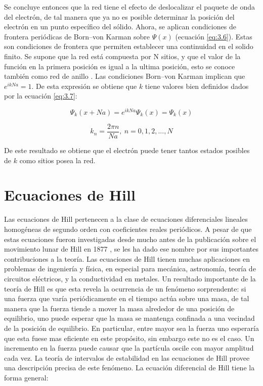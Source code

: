 Se concluye entonces que la red tiene el efecto de deslocalizar el paquete de onda del electrón, de tal manera que ya no es posible determinar la posición del electrón en un punto específico del sólido. 
Ahora, se aplican condiciones de frontera periódicas de Born–von Karman sobre $\Psi(x)$ (ecuación \ref{eq:3.6}). Estas son condiciones de frontera que permiten establecer una continuidad en el solido finito. Se supone que la red está compuesta por N sitios, y que el valor de la función en la primera posición es igual a la ultima posición, esto se conoce también como red de anillo \cite{solidos}. Las condiciones Born–von Karman implican que $e^{ikNa}=1$. De esta expresión se obtiene que $k$ tiene valores bien definidos dados por la ecuación \ref{eq:3.7}:

\begin{equation}\label{eq:3.6}
    \Psi_k(x+Na)=e^{ikNa}\Psi_k(x)=\Psi_k(x)
\end{equation}

\begin{equation}\label{eq:3.7}
k_n=\frac{2\pi n}{Na}, \ n={0,1,2,...,N}
\end{equation}

De este resultado se obtiene que el electrón puede tener tantos estados posibles de $k$ como sitios posea la red.


\section{Ecuaciones de Hill}\label{cap:4}

Las ecuaciones de Hill pertenecen a la clase de ecuaciones diferenciales lineales homogéneas de segundo orden con coeficientes reales periódicos. A pesar de que estas ecuaciones fueron investigadas desde mucho antes de la publicación sobre el movimiento lunar de Hill en 1877 \cite{moon}, se les ha dado ese nombre por sus importantes contribuciones a la teoría. Las ecuaciones de Hill tienen muchas aplicaciones en problemas de ingeniería y física, en especial para mecánica, astronomía, teoría de circuitos eléctricos, y la conductividad en metales. 
Un resultado importante de la teoría de Hill es que esta revela la ocurrencia de un fenómeno sorprendente: si una fuerza que varía periódicamente en el tiempo actúa sobre una masa, de tal manera que la fuerza tiende a mover la masa alrededor de una posición de equilibrio, uno puede esperar que la masa se mantenga confinada a una vecindad de la posición de equilibrio. En particular, entre mayor sea la fuerza uno esperaría que esta fuese mas eficiente en este propósito, sin embargo este no es el caso. Un incremento en la fuerza puede causar que la partícula oscile con mayor amplitud cada vez. La teoría de intervalos de estabilidad en las ecuaciones de Hill provee una descripción precisa de este fenómeno.
La ecuación diferencial de Hill tiene la forma general: 


